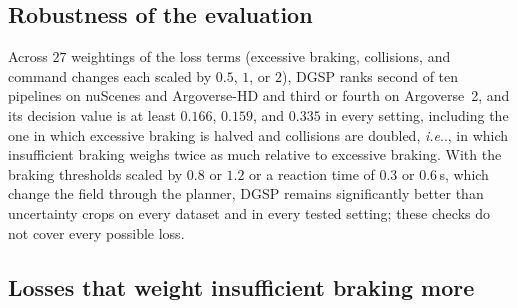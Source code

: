\documentclass[10pt,letterpaper]{article}
\makeatletter
\DeclareRobustCommand\onedot{\futurelet\@let@token\@onedot}
\def\@onedot{\ifx\@let@token.\else.\null\fi\xspace}
\def\ie{\emph{i.e}\onedot} \def\Ie{\emph{I.e}\onedot}
\newcommand{\method}{DGSP\xspace}
\theoremstyle{remark}
\theoremstyle{plain}
\theoremstyle{definition}
\makeatother
\begin{document}
\subsection{Robustness of the evaluation}
\label{sec:supp_robust}

Across $27$ weightings of the loss terms (excessive braking, collisions, and command changes each scaled by $0.5$, $1$, or $2$), \method ranks second of ten pipelines on nuScenes and Argoverse-HD and third or fourth on Argoverse~2, and its decision value is at least $0.166$, $0.159$, and $0.335$ in every setting, including the one in which excessive braking is halved and collisions are doubled, \ie, in which insufficient braking weighs twice as much relative to excessive braking.
With the braking thresholds scaled by $0.8$ or $1.2$ or a reaction time of $0.3$ or $0.6$\,s, which change the field through the planner, \method remains significantly better than uncertainty crops on every dataset and in every tested setting; these checks do not cover every possible loss.


\subsection{Losses that weight insufficient braking more}
\label{sec:supp_safety}
\end{document}
